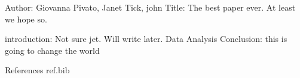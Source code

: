 Author: Giovanna Pivato, Janet Tick, john
Title: The best paper ever. At least we hope so.

introduction: Not sure jet. Will write later.
Data
Analysis
Conclusion: this is going to change the world

References
ref.bib

